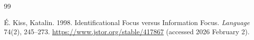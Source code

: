 \documentclass[ruler]{CUP-JNL-LIN}%
\begin{document}
\begin{Backmatter}
\begin{thebibliography}{99}

{É. Kiss, Katalin}. 1998. Identificational Focus versus Information Focus. \textit{Language} 74(2), 245--273. \url{https://www.jstor.org/stable/417867} (accessed 2026 February 2).



\end{thebibliography}
\end{Backmatter}
\end{document}

